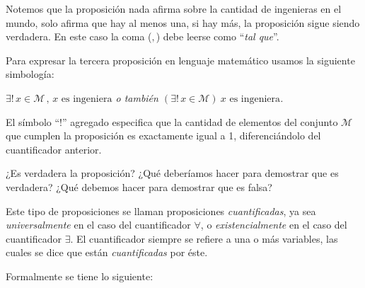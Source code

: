 \begin{ejemplo}
Notemos que la proposición nada afirma sobre la cantidad de ingenieras en el
mundo, 
solo afirma que hay al menos una, si hay más, 
la proposición sigue siendo verdadera.
En este caso la coma ($,$) debe leerse como ``{\em tal que}''.

Para expresar la tercera proposición en lenguaje matemático usamos 
la siguiente simbología:

\centerline{\em $\exists !\, x \in {\mathcal M}\,,\, x \textrm{ es ingeniera}$
\quad o tambi\'en \quad 
$(\exists !\, x \in {\mathcal M})\ x \textrm{ es ingeniera}$.}

El símbolo ``!'' agregado especifica que la cantidad de elementos 
del conjunto ${\mathcal M}$
que cumplen la proposición es exactamente igual a 1, 
diferenciándolo del cuantificador anterior.

¿Es verdadera la proposición? 
¿Qu\'e deberíamos hacer para demostrar que es verdadera? 
¿Qu\'e debemos hacer para demostrar que es falsa?
\end{ejemplo}

Este tipo de proposiciones se llaman proposiciones {\em cuantificadas}, 
ya sea {\em universalmente} en el caso del cuantificador $\forall$, 
o {\em existencialmente} en el caso del cuantificador $\exists$.
El cuantificador siempre se refiere a una o más variables, 
las cuales se dice que están {\em cuantificadas} por \'este.

Formalmente se tiene lo siguiente:

